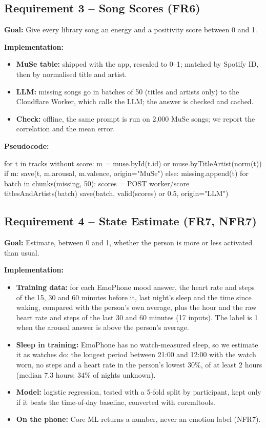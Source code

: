 \documentclass[conference]{IEEEtran}
\newcommand{\goal}[1]{\noindent\textbf{Goal:} #1\par\smallskip}
\newcommand{\impl}{\noindent\textbf{Implementation:}}
\newcommand{\pcode}{\noindent\textbf{Pseudocode:}}
\begin{document}
\subsection{Requirement 3 -- Song Scores (FR6)}
\goal{Give every library song an energy and a positivity score between 0 and 1.}
\impl
\begin{itemize}
\item \textbf{MuSe table:} shipped with the app, rescaled to 0--1; matched by Spotify ID, then by normalised title and artist.
\item \textbf{LLM:} missing songs go in batches of 50 (titles and artists only) to the Cloudflare Worker, which calls the LLM; the answer is checked and cached.
\item \textbf{Check:} offline, the same prompt is run on 2,000 MuSe songs; we report the correlation and the mean error.
\end{itemize}
\par\noindent\begin{minipage}{\columnwidth}
\pcode
\begin{code}
for t in tracks without score:
  m = muse.byId(t.id) or muse.byTitleArtist(norm(t))
  if m: save(t, m.arousal, m.valence, origin="MuSe")
  else: missing.append(t)
for batch in chunks(missing, 50):
  scores = POST worker/score {titlesAndArtists(batch)}
  save(batch, valid(scores) or 0.5, origin="LLM")
\end{code}
\end{minipage}\par

\subsection{Requirement 4 -- State Estimate (FR7, NFR7)}\label{sec:req4}
\goal{Estimate, between 0 and 1, whether the person is more or less activated than usual.}
\impl
\begin{itemize}
\item \textbf{Training data:} for each EmoPhone mood answer, the heart rate and steps of the 15, 30 and 60 minutes before it, last night's sleep and the time since waking, compared with the person's own average, plus the hour and the raw heart rate and steps of the last 30 and 60 minutes (17 inputs). The label is 1 when the arousal answer is above the person's average.
\item \textbf{Sleep in training:} EmoPhone has no watch-measured sleep, so we estimate it as watches do: the longest period between 21:00 and 12:00 with the watch worn, no steps and a heart rate in the person's lowest 30\%, of at least 2 hours (median 7.3 hours; 34\% of nights unknown).
\item \textbf{Model:} logistic regression, tested with a 5-fold split by participant, kept only if it beats the time-of-day baseline, converted with coremltools.
\item \textbf{On the phone:} Core ML returns a number, never an emotion label (NFR7).
\end{itemize}
\end{document}
